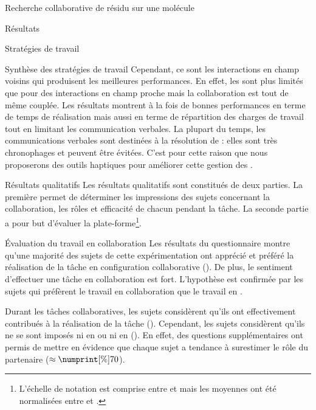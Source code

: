 \documentclass[myfrancais,ngerman,english,frenchb]{mythesis}
\begin{document}
\begin{mychapter}{Recherche collaborative de résidu sur une molécule}
\begin{mysection}{Résultats}
\begin{mysubsection}{Stratégies de travail}
\begin{mysubsubsection}{Synthèse des stratégies de travail}
					Cependant, ce sont les interactions en champ voisins qui produisent les meilleures performances.
					En effet, les  sont plus limités que pour des interactions en champ proche mais la collaboration est tout de même couplée.
					Les résultats montrent à la fois de bonnes performances en terme de temps de réalisation mais aussi en terme de répartition des charges de travail tout en limitant les communication verbales.
					La plupart du temps, les communications verbales sont destinées à la résolution de  : elles sont très chronophages et peuvent être évitées.
					C'est pour cette raison que nous proposerons des outils haptiques pour améliorer cette gestion des  .
				\end{mysubsubsection}
			\end{mysubsection}
			\begin{mysubsection}{Résultats qualitatifs}
				Les résultats qualitatifs sont constitués de deux parties.
				La première permet de déterminer les impressions des sujets concernant la collaboration, les rôles et efficacité de chacun pendant la tâche.
				La seconde partie a pour but d'évaluer la plate-forme\footnote{L'échelle de notation est comprise entre  et  mais les moyennes ont été normalisées entre  et .}.
				\begin{mysubsubsection}{Évaluation du travail en collaboration}
					Les résultats du questionnaire montre qu'une majorité des sujets de cette expérimentation ont apprécié et préféré la réalisation de la tâche en configuration collaborative ().
					De plus, le sentiment d'effectuer une tâche en collaboration est fort.
					L'hypothèse  est confirmée par les sujets qui préfèrent le travail en collaboration que le travail en .

					Durant les tâches collaboratives, les sujets considèrent qu'ils ont effectivement contribués à la réalisation de la tâche ().
					Cependant, les sujets considèrent qu'ils ne se sont imposés ni en  ou ni en  ().
					En effet, des questions supplémentaires ont permis de mettre en évidence que chaque sujet a tendance à surestimer le rôle du partenaire ($\approx\mynum[\%]{70}$).


\end{mysubsubsection}
\end{mysubsection}
\end{mysection}
\end{mychapter}
\end{document}
